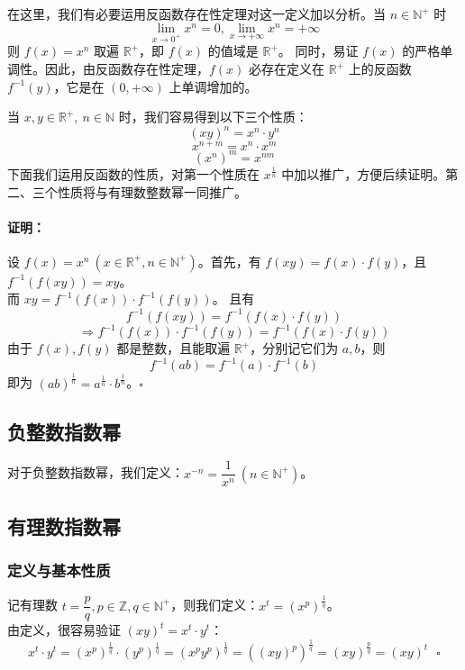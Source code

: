 \documentclass[UTF8,12pt]{ctexart}
\begin{document}
        在这里，我们有必要运用反函数存在性定理对这一定义加以分析。当 $n \in \mathbb N^+$ 时
        $$
        \lim_{x \to 0^+} x^n = 0, \lim_{x \to +\infty} x^n = +\infty
        $$
        则 $f(x) = x^n$ 取遍 $\mathbb R^+$，即 $f(x)$ 的值域是 $\mathbb{R}^+$。
        同时，易证 $f(x)$ 的严格单调性。因此，由反函数存在性定理，$f(x)$ 必存在定义在 $\mathbb R^+$ 上的反函数 $f^{-1}(y)$，它是在 $(0, +\infty)$ 上单调增加的。

        当 $x, y \in \mathbb R^+,\ n \in \mathbb N$ 时，我们容易得到以下三个性质：
        $$
        (xy)^n = x^n\cdot y^n
        $$
        $$
        x^{n + m} = x^n\cdot x^m
        $$
        $$
        (x^n)^m = x^{nm}
        $$
        下面我们运用反函数的性质，对第一个性质在 $x^{\frac 1 n}$ 中加以推广，方便后续证明。第二、三个性质将与有理数整数幂一同推广。

        \paragraph{证明：}
        设 $f(x) = x^n\ (x \in \mathbb R^+, n \in \mathbb N^+)$。首先，有 $f(xy) = f(x)\cdot f(y)$，且 $f^{-1}(f(xy)) = xy$。\\
        而 $xy = f^{-1}(f(x))\cdot f^{-1}(f(y))$。
        且有 $$
        f^{-1}(f(xy)) = f^{-1}(f(x)\cdot f(y))
        $$
        $$
        \Rightarrow f^{-1}(f(x))\cdot f^{-1}(f(y)) = f^{-1}(f(x)\cdot f(y))
        $$
        由于 $f(x), f(y)$ 都是整数，且能取遍 $\mathbb R^+$，分别记它们为 $a, b$，则
        $$
        f^{-1}(ab) = f^{-1}(a) \cdot f^{-1}(b)
        $$
        即为 $(ab)^{\frac 1 n} = a^{\frac 1 n}\cdot b^{\frac 1 n}$。$\square$

    \subsection{负整数指数幂}
        对于负整数指数幂，我们定义：$x^{-n} = \dfrac 1 {x^{n}}\ (n \in \mathbb N^+)$。
    
    \subsection{有理数指数幂}
        \subsubsection{定义与基本性质}
            记有理数 $t = \dfrac p q, p \in \mathbb Z, q \in \mathbb N^+$，则我们定义：$x^t = (x^p)^{\frac 1 q}$。\\
            由定义，很容易验证 $(xy)^t = x^t\cdot y^t$：
            $$
            x^t\cdot y^t = (x^p)^{\frac 1 q}\cdot (y^p)^{\frac 1 q} = (x^p y^p)^{\frac 1 q} = ((xy)^p)^{\frac 1 q} = (xy)^{\frac p q} = (xy)^t\ \ \ \square
            $$
\end{document}

